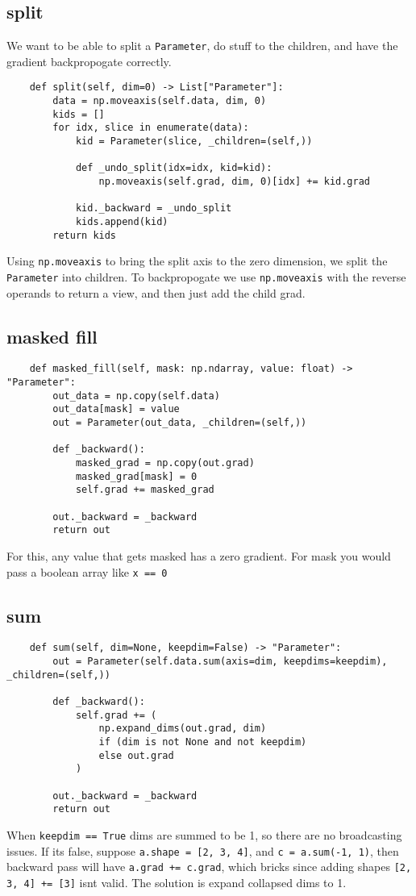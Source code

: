 \documentclass[11pt]{article}
\begin{document}
\subsection{split}
We want to be able to split a \texttt{Parameter}, do stuff to the children, and have the gradient backpropogate 
correctly. 
\begin{verbatim}
    def split(self, dim=0) -> List["Parameter"]:
        data = np.moveaxis(self.data, dim, 0)
        kids = []
        for idx, slice in enumerate(data):
            kid = Parameter(slice, _children=(self,))

            def _undo_split(idx=idx, kid=kid):
                np.moveaxis(self.grad, dim, 0)[idx] += kid.grad

            kid._backward = _undo_split
            kids.append(kid)
        return kids
\end{verbatim}
Using \texttt{np.moveaxis} to bring the split axis to the zero dimension, we split the \texttt{Parameter} into children. 
To backpropogate we use \texttt{np.moveaxis} with the reverse operands to return a view, and then just add the child grad.
\subsection{masked fill}
\begin{verbatim}
    def masked_fill(self, mask: np.ndarray, value: float) -> "Parameter":
        out_data = np.copy(self.data)
        out_data[mask] = value
        out = Parameter(out_data, _children=(self,))

        def _backward():
            masked_grad = np.copy(out.grad)
            masked_grad[mask] = 0
            self.grad += masked_grad

        out._backward = _backward
        return out
\end{verbatim}
For this, any value that gets masked has a zero gradient. For mask you would pass a boolean array like \texttt{x == 0}
\subsection{sum}
\begin{verbatim}
    def sum(self, dim=None, keepdim=False) -> "Parameter":
        out = Parameter(self.data.sum(axis=dim, keepdims=keepdim), _children=(self,))

        def _backward():
            self.grad += (
                np.expand_dims(out.grad, dim)
                if (dim is not None and not keepdim)
                else out.grad
            )

        out._backward = _backward
        return out
\end{verbatim}
When \texttt{keepdim == True} dims are summed to be 1, so there are no broadcasting issues. If its false,
suppose \texttt{a.shape = [2, 3, 4]}, and \texttt{c = a.sum(-1, 1)}, then backward pass will have
\texttt{a.grad += c.grad}, which bricks since adding shapes
\texttt{[2, 3, 4] += [3]} isnt valid. The solution is expand collapsed dims to 1.
\end{document}
